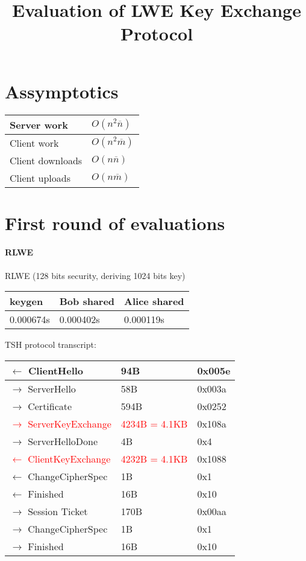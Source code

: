 \documentclass[12pt]{article}
\newcommand{\nbar}{\overline{n}}
\newcommand{\mbar}{\overline{m}}
\begin{document}
\title{Evaluation of LWE Key Exchange Protocol}
\maketitle

\section{Assymptotics}
\begin{center}
    \begin{tabular}{| l | l |}
    \hline
Server work & $O(n^2\nbar)$\\ \hline
Client work & $O(n^2\mbar)$\\ \hline
Client downloads & $O(n \nbar)$\\ \hline
Client uploads & $O(n \mbar)$\\ \hline
    \end{tabular}
\end{center}

\section{First round of evaluations}
\paragraph{RLWE}
RLWE (128 bits security, deriving 1024 bits key)
\begin{center}
    \begin{tabular}{| l | l | l |}
    \hline
    keygen & Bob shared & Alice shared \\ \hline
    0.000674s & 0.000402s & 0.000119s  \\ \hline
    \end{tabular}
\end{center}

TSH protocol transcript:
\begin{center}
    \begin{tabular}{| l | l | l |}
    \hline
    $\leftarrow$ ClientHello & 94B & 0x005e\\ \hline
    $\rightarrow$ ServerHello & 58B & 0x003a\\ \hline
    $\rightarrow$ Certificate & 594B & 0x0252\\ \hline
    \textcolor{red}{$\rightarrow$ ServerKeyExchange} & \textcolor{red}{4234B = 4.1KB} & 0x108a\\ \hline
    $\rightarrow$ ServerHelloDone & 4B & 0x4\\ \hline
    \textcolor{red}{$\leftarrow$ ClientKeyExchange} & \textcolor{red}{4232B = 4.1KB} & 0x1088\\ \hline
    $\leftarrow$ ChangeCipherSpec & 1B & 0x1\\ \hline
    $\leftarrow$ Finished & 16B & 0x10\\ \hline
    $\rightarrow$ Session Ticket & 170B & 0x00aa\\ \hline
    $\rightarrow$ ChangeCipherSpec & 1B & 0x1\\ \hline
    $\rightarrow$ Finished & 16B & 0x10\\ \hline
    \end{tabular}
\end{center}
\end{document}
